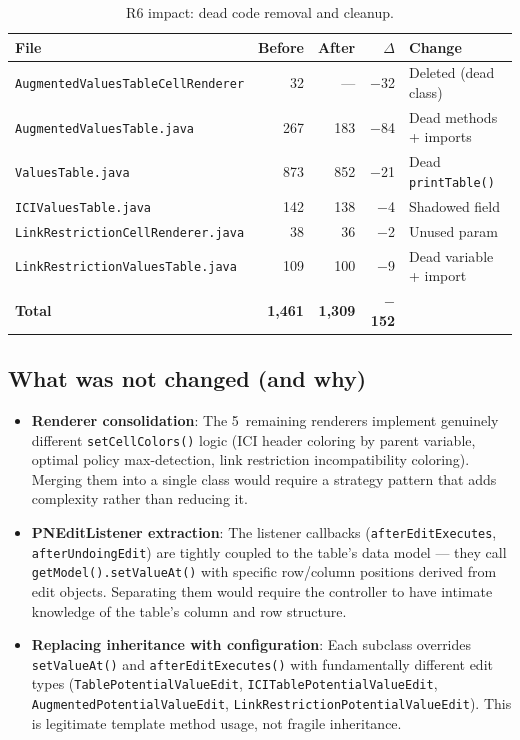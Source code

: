 \documentclass[12pt,a4paper]{article}
\newcommand{\code}[1]{\texttt{#1}}
\newcommand{\file}[1]{\texttt{#1}}
\begin{document}
\begin{table}[H]
\centering
\begin{tabularx}{\textwidth}{l r r r X}
\toprule
\textbf{File} & \textbf{Before} & \textbf{After} & \textbf{$\Delta$} & \textbf{Change} \\
\midrule
\file{AugmentedValuesTableCellRenderer} & 32 & --- & $-$32 & Deleted (dead class) \\
\file{AugmentedValuesTable.java} & 267 & 183 & $-$84 & Dead methods + imports \\
\file{ValuesTable.java} & 873 & 852 & $-$21 & Dead \code{printTable()} \\
\file{ICIValuesTable.java} & 142 & 138 & $-$4 & Shadowed field \\
\file{LinkRestrictionCellRenderer.java} & 38 & 36 & $-$2 & Unused param \\
\file{LinkRestrictionValuesTable.java} & 109 & 100 & $-$9 & Dead variable + import \\
\midrule
\textbf{Total} & \textbf{1{,}461} & \textbf{1{,}309} & \textbf{$-$152} & \\
\bottomrule
\end{tabularx}
\caption{R6 impact: dead code removal and cleanup.}
\label{tab:r6-impact}
\end{table}

\subsection{What was not changed (and why)}

\begin{itemize}
  \item \textbf{Renderer consolidation}: The 5~remaining renderers
        implement genuinely different \code{setCellColors()} logic (ICI
        header coloring by parent variable, optimal policy
        max-detection, link restriction incompatibility coloring).
        Merging them into a single class would require a strategy
        pattern that adds complexity rather than reducing it.
  \item \textbf{PNEditListener extraction}: The listener callbacks
        (\code{afterEditExecutes}, \code{afterUndoingEdit}) are tightly
        coupled to the table's data model --- they call
        \code{getModel().setValueAt()} with specific row/column
        positions derived from edit objects. Separating them would
        require the controller to have intimate knowledge of the
        table's column and row structure.
  \item \textbf{Replacing inheritance with configuration}: Each
        subclass overrides \code{setValueAt()} and
        \code{afterEditExecutes()} with fundamentally different edit
        types (\code{TablePotentialValueEdit},
        \code{ICITablePotentialValueEdit},
        \code{AugmentedPotentialValueEdit},
        \code{LinkRestrictionPotentialValueEdit}). This is legitimate
        template method usage, not fragile inheritance.
\end{itemize}
\end{document}
